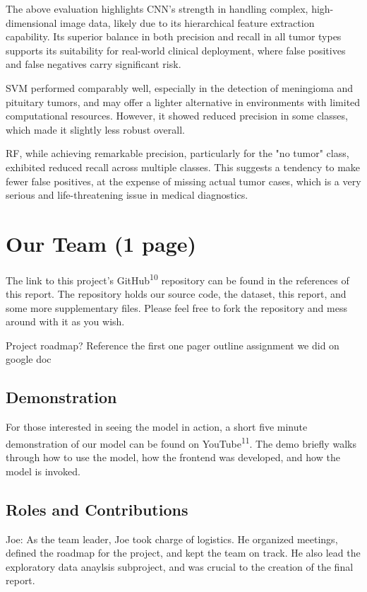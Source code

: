 \documentclass[conference]{IEEEtran}
\begin{document}
The above evaluation highlights CNN's strength in handling complex, high-dimensional image data, likely due to its hierarchical feature extraction capability. Its superior balance in both precision and recall in all tumor types supports its suitability for real-world clinical deployment, where false positives and false negatives carry significant risk.

SVM performed comparably well, especially in the detection of meningioma and pituitary tumors, and may offer a lighter alternative in environments with limited computational resources. However, it showed reduced precision in some classes, which made it slightly less robust overall.

RF, while achieving remarkable precision, particularly for the "no tumor" class, exhibited reduced recall across multiple classes. This suggests a tendency to make fewer false positives, at the expense of missing actual tumor cases, which is a very serious and life-threatening issue in medical diagnostics.

\section{\large Our Team (1 page)}

The link to this project's GitHub\textsuperscript{10} repository can be found in the references of this report. The repository holds our source code, the dataset, this report, and some more supplementary files. Please feel free to fork the repository and mess around with it as you wish.

Project roadmap? Reference the first one pager outline assignment we did on google doc

\subsection{\large Demonstration}

For those interested in seeing the model in action, a short five minute demonstration of our model can be found on YouTube\textsuperscript{11}. The demo briefly walks through how to use the model, how the frontend was developed, and how the model is invoked.

\subsection{\large Roles and Contributions}

Joe: As the team leader, Joe took charge of logistics. He organized meetings, defined the roadmap for the project, and kept the team on track. He also lead the exploratory data anaylsis subproject, and was crucial to the creation of the final report. 
\end{document}
